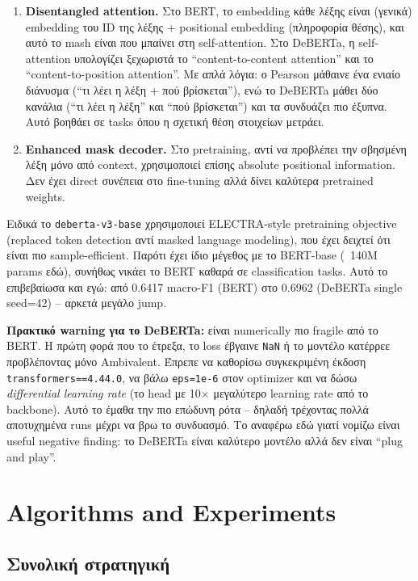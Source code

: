 \documentclass[12pt]{fphw}
\begin{document}
\begin{enumerate}
    \item \textbf{Disentangled attention.} Στο BERT, το embedding κάθε λέξης είναι (γενικά) embedding του ID της λέξης + positional embedding (πληροφορία θέσης), και αυτό το mash είναι που μπαίνει στη self-attention. Στο DeBERTa, η self-attention υπολογίζει ξεχωριστά το ``content-to-content attention'' και το ``content-to-position attention''. Με απλά λόγια: ο Pearson μάθαινε ένα ενιαίο διάνυσμα (``τι λέει η λέξη + πού βρίσκεται''), ενώ το DeBERTa μάθει δύο κανάλια (``τι λέει η λέξη'' και ``πού βρίσκεται'') και τα συνδυάζει πιο έξυπνα. Αυτό βοηθάει σε tasks όπου η σχετική θέση στοιχείων μετράει.
    \item \textbf{Enhanced mask decoder.} Στο pretraining, αντί να προβλέπει την σβησμένη λέξη μόνο από context, χρησιμοποιεί επίσης absolute positional information. Δεν έχει direct συνέπεια στο fine-tuning αλλά δίνει καλύτερα pretrained weights.
\end{enumerate}

Ειδικά το \texttt{deberta-v3-base} χρησιμοποιεί ELECTRA-style pretraining objective (replaced token detection αντί masked language modeling), που έχει δειχτεί ότι είναι πιο sample-efficient. Παρότι έχει ίδιο μέγεθος με το BERT-base (~140M params εδώ), συνήθως νικάει το BERT καθαρά σε classification tasks. Αυτό το επιβεβαίωσα και εγώ: από 0.6417 macro-F1 (BERT) στο 0.6962 (DeBERTa single seed=42) -- αρκετά μεγάλο jump.

\textbf{Πρακτικό warning για το DeBERTa:} είναι numerically πιο fragile από το BERT. Η πρώτη φορά που το έτρεξα, το loss έβγαινε \texttt{NaN} ή το μοντέλο κατέρρεε προβλέποντας μόνο Ambivalent. Έπρεπε να καθορίσω συγκεκριμένη έκδοση \texttt{transformers==4.44.0}, να βάλω \texttt{eps=1e-6} στον optimizer και να δώσω \emph{differential learning rate} (το head με 10$\times$ μεγαλύτερο learning rate από το backbone). Αυτό το έμαθα την πιο επώδυνη ρότα -- δηλαδή τρέχοντας πολλά αποτυχημένα runs μέχρι να βρω το συνδυασμό. Το αναφέρω εδώ γιατί νομίζω είναι useful negative finding: το DeBERTa είναι καλύτερο μοντέλο αλλά δεν είναι ``plug and play''.

\section{Algorithms and Experiments}

\subsection{Συνολική στρατηγική}
\end{document}
